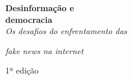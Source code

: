 




\begingroup\thispagestyle{empty}\vspace*{.05\textheight} 

              \Huge
              \noindent
              \textbf{Desinformação e\\democracia}\\
              \smallskip
              \noindent\LARGE\textit{Os desafios do enfrentamento das}
              \vspace*{-.3cm}

              \noindent\LARGE\textit{fake news na internet}
              
              \vspace{4em}


              \vspace{5em}

              \noindent
              {\normalsize\noindent 1ª edição}

              \vfill

              \newfontfamily{}
              \smallskip


\endgroup
\pagebreak

